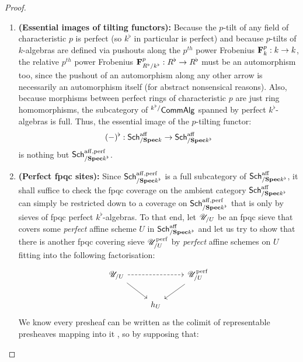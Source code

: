                     \begin{proof}
                        \noindent
                        \begin{enumerate}
                            \item \textbf{(Essential images of tilting functors):} Because the $p$-tilt of any field of characteristic $p$ is perfect (so $k^{\flat}$ in particular is perfect) and because $p$-tilts of $k$-algebras are defined via pushouts along the $p^{th}$ power Frobenius $\mathbf{F}_k^p: k \to k$, the relative $p^{th}$ power Frobenius $\mathbf{F}^p_{R^{\flat}/k^{\flat}}: R^{\flat} \to R^{\flat}$ must be an automorphism too, since the pushout of an automorphism along any other arrow is necessarily an automorphism itself (for abstract nonsensical reasons). Also, because morphisms between perfect rings of characteristic $p$ are just ring homomorphisms, the subcategory of ${}^{k^{\flat}/}\mathsf{Comm}\mathsf{Alg}$ spanned by perfect $k^{\flat}$-algebras is full. Thus, the essential image of the $p$-tilting functor:
                                $$(-)^{\flat}: \mathsf{Sch}^{\mathrm{aff}}_{/\mathbf{Spec} k} \to \mathsf{Sch}^{\mathrm{aff}}_{/\mathbf{Spec} k^{\flat}}$$
                            is nothing but $\mathsf{Sch}^{\mathrm{aff}, \mathrm{perf}}_{/\mathbf{Spec} k^{\flat}}$.
                            \item \textbf{(Perfect fpqc sites):} Since $\mathsf{Sch}^{\mathrm{aff}, \mathrm{perf}}_{/\mathbf{Spec} k^{\flat}}$ is a full subcategory of $\mathsf{Sch}^{\mathrm{aff}}_{/\mathbf{Spec} k^{\flat}}$, it shall suffice to check the fpqc coverage on the ambient category $\mathsf{Sch}^{\mathrm{aff}}_{/\mathbf{Spec} k^{\flat}}$ can simply be restricted down to a coverage on $\mathsf{Sch}^{\mathrm{aff}, \mathrm{perf}}_{/\mathbf{Spec} k^{\flat}}$ that is only by sieves of fpqc perfect $k^{\flat}$-algebras. To that end, let $\mathscr{U}_{/U}$ be an fpqc sieve that covers some \textit{perfect} affine scheme $U$ in $\mathsf{Sch}^{\mathrm{aff}}_{/\mathbf{Spec} k^{\flat}}$ and let us try to show that there is another fpqc covering sieve $\mathscr{U}_{/U}^{\mathrm{perf}}$ by \textit{perfect} affine schemes on $U$ fitting into the following factorisation:
                                $$
                                    \begin{tikzcd}
                                    	\U_{/U} && {\U^{\perf}_{/U}} \\
                                    	& h_U
                                    	\arrow[from=1-1, to=2-2]
                                    	\arrow[from=1-3, to=2-2]
                                    	\arrow[dashed, from=1-1, to=1-3]
                                    \end{tikzcd}
                                $$
                            We know every presheaf can be written as the colimit of representable presheaves mapping into it \cite[Section 4]{nlab:presheaf}, so by supposing that:

\end{enumerate}
\end{proof}
